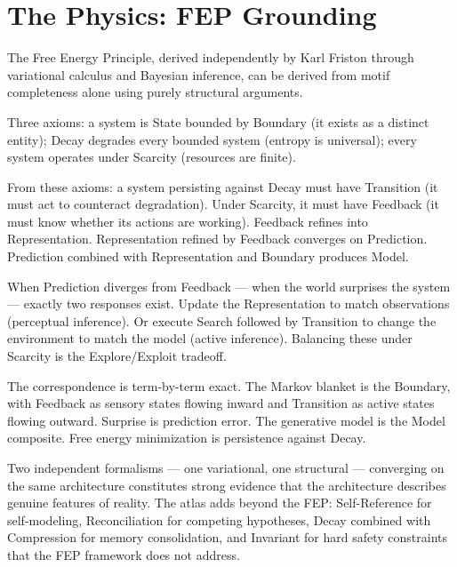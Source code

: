 \documentclass[11pt,a4paper]{article}
\begin{document}
\section{The Physics: FEP Grounding}

The Free Energy Principle, derived independently by Karl Friston through variational calculus and Bayesian inference, can be derived from motif completeness alone using purely structural arguments.

Three axioms: a system is State bounded by Boundary (it exists as a distinct entity); Decay degrades every bounded system (entropy is universal); every system operates under Scarcity (resources are finite).

From these axioms: a system persisting against Decay must have Transition (it must act to counteract degradation). Under Scarcity, it must have Feedback (it must know whether its actions are working). Feedback refines into Representation. Representation refined by Feedback converges on Prediction. Prediction combined with Representation and Boundary produces Model.

When Prediction diverges from Feedback --- when the world surprises the system --- exactly two responses exist. Update the Representation to match observations (perceptual inference). Or execute Search followed by Transition to change the environment to match the model (active inference). Balancing these under Scarcity is the Explore/Exploit tradeoff.

The correspondence is term-by-term exact. The Markov blanket is the Boundary, with Feedback as sensory states flowing inward and Transition as active states flowing outward. Surprise is prediction error. The generative model is the Model composite. Free energy minimization is persistence against Decay.

Two independent formalisms --- one variational, one structural --- converging on the same architecture constitutes strong evidence that the architecture describes genuine features of reality. The atlas adds beyond the FEP: Self-Reference for self-modeling, Reconciliation for competing hypotheses, Decay combined with Compression for memory consolidation, and Invariant for hard safety constraints that the FEP framework does not address.
\end{document}
